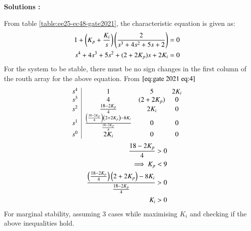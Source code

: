 \documentclass[journal,12pt,onecolumn]{IEEEtran}
\theoremstyle{remark}
\begin{document}
\textbf{Solutions :}
\fi
    
    From table \ref{table:ee25-ec48-gate2021}, the characteristic equation is given as:
    \begin{align}
        1+\left(K_p+\frac{K_i}{s}\right)\left(\frac{2}{s^3+4s^2+5s+2}\right) &= 0\\
        s^4+4s^3+5s^2+(2+2K_p)s+2K_i &=0 \label{eq:gate 2021 eq:4}
    \end{align}
    For the system to be stable, there must be no sign changes in the first column of the routh array for the above equation. From $\eqref{eq:gate 2021 eq:4}$
    \begin{align}
    \begin{array}{c|cccc}
        s^4 & 1 & 5 & 2K_i \\
        s^3 & 4 & (2 + 2K_p) & 0 \\
        s^2 & \frac{18-2K_p}{4} & 2K_i & 0 \\
        s^1 &  \frac{\left(\frac{18-2K_p}{4}\right)\left(2 + 2K_p\right)-8K_i}{\frac{18-2K_p}{4}} & 0 & 0\\
        s^0 & 2K_i &0 &0 \\
        \end{array}\\
        \end{align}
        \begin{align}
            \frac{18-2K_p}{4} &> 0\\
            \implies K_p &< 9 \label{eq:gate 2021 eq:1}\\
            \frac{\left(\frac{18-2K_p}{4}\right)\left(2 + 2K_p\right)-8K_i}{\frac{18-2K_p}{4}} &> 0\label{eq:gate 2021 eq:2}\\
        K_i &>0 \label{eq:gate 2021 eq:3}
    \end{align}
    For marginal stability, assuming 3 cases while maximising $K_i$ and checking if the above inequalities hold.
\end{document}
